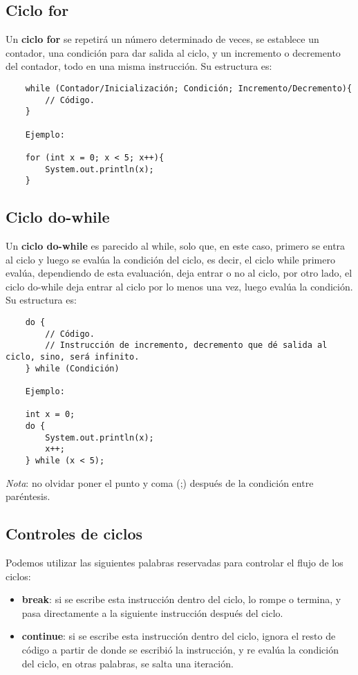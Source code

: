 \subsection{Ciclo for}

Un \textbf{ciclo for} se repetirá un número determinado de veces, se establece un contador, una condición para dar salida al ciclo, y un incremento o decremento del contador, todo en una misma instrucción. Su estructura es:
\begin{lstlisting}
    while (Contador/Inicialización; Condición; Incremento/Decremento){
        // Código.
    }
    
    Ejemplo:
    
    for (int x = 0; x < 5; x++){
        System.out.println(x);
    }
\end{lstlisting}


\subsection{Ciclo do-while}

Un \textbf{ciclo do-while} es parecido al while, solo que, en este caso, primero se entra al ciclo y luego se evalúa la condición del ciclo, es decir, el ciclo while primero evalúa, dependiendo de esta evaluación, deja entrar o no al ciclo, por otro lado, el ciclo do-while deja entrar al ciclo por lo menos una vez, luego evalúa la condición. Su estructura es:
\begin{lstlisting}
    do {
        // Código.
        // Instrucción de incremento, decremento que dé salida al ciclo, sino, será infinito.
    } while (Condición)
    
    Ejemplo:
    
    int x = 0;
    do {
        System.out.println(x);
        x++;
    } while (x < 5);
\end{lstlisting}

\textit{Nota}: no olvidar poner el punto y coma (;) después de la condición entre paréntesis.


\subsection{Controles de ciclos}

Podemos utilizar las siguientes palabras reservadas para controlar el flujo de los ciclos:
\begin{itemize}
    \item \textbf{break}: si se escribe esta instrucción dentro del ciclo, lo rompe o termina, y pasa directamente a la siguiente instrucción después del ciclo.
    \item \textbf{continue}: si se escribe esta instrucción dentro del ciclo, ignora el resto de código a partir de donde se escribió la instrucción, y re evalúa la condición del ciclo, en otras palabras, se salta una iteración.
\end{itemize}

